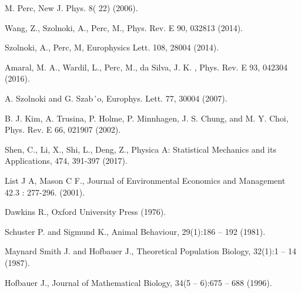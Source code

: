 \documentclass[%
 aip,
 amsmath,amssymb,
 reprint,%
]{revtex4-1}
\begin{document}
\begin{thebibliography}{99}
M. Perc,
\newblock  New J. Phys. 8( 22) (2006).

Wang, Z., Szolnoki, A., Perc, M.,
\newblock  Phys. Rev. E 90, 032813 (2014).

Szolnoki, A., Perc, M,
\newblock  Europhysics Lett. 108, 28004 (2014).

Amaral, M. A., Wardil, L., Perc, M., da Silva, J. K. ,
\newblock  Phys. Rev. E 93, 042304 (2016).

A. Szolnoki and G. Szab´o,
\newblock  Europhys. Lett. 77, 30004 (2007).

B. J. Kim, A. Trusina, P. Holme, P. Minnhagen, J. S. Chung, and M. Y. Choi,
\newblock  Phys. Rev. E 66, 021907 (2002).

Shen, C., Li, X., Shi, L., Deng, Z.,
\newblock  Physica A: Statistical Mechanics and its Applications, 474, 391-397 (2017).

List J A, Mason C F.,
\newblock  Journal of Environmental Economics and Management 42.3 : 277-296. (2001).

Dawkins R.,
\newblock   Oxford University Press (1976).

Schuster P. and Sigmund K.,
\newblock Animal Behaviour, 29(1):186 – 192 (1981).

Maynard Smith J. and Hofbauer J.,
\newblock  Theoretical Population Biology, 32(1):1 – 14 (1987).

Hofbauer J.,
\newblock Journal of Mathematical Biology, 34(5 – 6):675 – 688 (1996).


\end{thebibliography}
\end{document}

